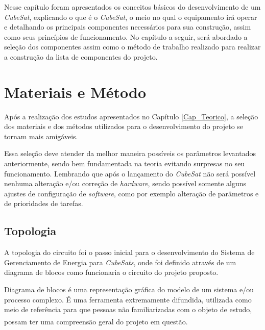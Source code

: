 \documentclass[
	12pt,				%
	openright,			%
	oneside,			%
	a4paper,			%
	english,			%
	french,				%
	spanish,			%
	brazil,				%
	oldfontcommands
	]{abntex2}
\begin{document}
	Nesse capítulo foram apresentados os conceitos básicos do desenvolvimento de um \textit{CubeSat}, explicando o que é o \textit{CubeSat}, o meio no qual o equipamento irá operar e detalhando os principais componentes necessários para sua construção, assim como seus princípios de funcionamento. No capítulo a seguir, será abordado a seleção dos componentes assim como o método de trabalho realizado para realizar a construção da lista de componentes do projeto.


\chapter[Materiais e Método]{Materiais e Método}

	Após a realização dos estudos apresentados no Capítulo \ref{Cap_Teorico}, a seleção dos materiais e dos métodos utilizados para o desenvolvimento do projeto se tornam mais amigáveis. 
	
	Essa seleção deve atender da melhor maneira possíveis os parâmetros levantados anteriormente, sendo bem fundamentada na teoria evitando surpresas no seu funcionamento. Lembrando que após o lançamento do \textit{CubeSat} não será possível nenhuma alteração e/ou correção de \textit{hardware}, sendo possível somente alguns ajustes de configuração de \textit{software}, como por exemplo alteração de parâmetros e de prioridades de tarefas.
	
\section[Topologia]{Topologia}

	A topologia do circuito foi o passo inicial para o desenvolvimento do Sistema de Gerenciamento de Energia para \textit{CubeSats}, onde foi definido através de um diagrama de blocos como funcionaria o circuito do projeto proposto.
	
	Diagrama de blocos é uma representação gráfica do modelo de um sistema e/ou processo complexo. É uma ferramenta extremamente difundida, utilizada como meio de referência para que pessoas não familiarizadas com o objeto de estudo, possam ter uma compreensão geral do projeto em questão.\textsuperscript{\cite{Diag_Blocos}}	
		
\end{document}
